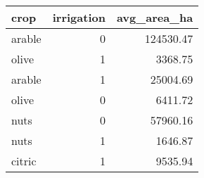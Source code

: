 
\begin{tabular}{lrr}
  \hline
  crop   & irrigation & avg\_area\_ha \\
  \hline
  arable & 0          & 124530.47     \\
  olive  & 1          & 3368.75       \\
  arable & 1          & 25004.69      \\
  olive  & 0          & 6411.72       \\
  nuts   & 0          & 57960.16      \\
  nuts   & 1          & 1646.87       \\
  citric & 1          & 9535.94       \\
  \hline
\end{tabular}

